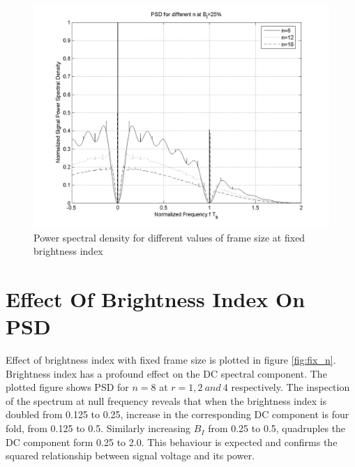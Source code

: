  \begin{figure}[!hbtp]
  \includegraphics[width=\figwidth]{./Figures/252.png}  
  \caption[Effect of frame size on PSD]{Power spectral density for different values of frame size at fixed brightness index}
  \label {fig:fix_bi}
 \end{figure}

\section{Effect Of Brightness Index On PSD}
Effect of brightness index with fixed frame size is plotted in figure \ref{fig:fix_n}. Brightness index has a profound effect on the DC spectral component. The plotted figure shows PSD for $n=8$ at $r=1,2~and~4$ respectively. The inspection of the spectrum at null frequency reveals that when the brightness index is doubled from 0.125 to 0.25,
increase in the corresponding DC component is four fold, from 0.125 to 0.5. Similarly increasing $B_I$ from 0.25 to 0.5, quadruples the DC component form 0.25 to 2.0. This behaviour is expected and confirms the squared relationship between signal voltage and its power. 


